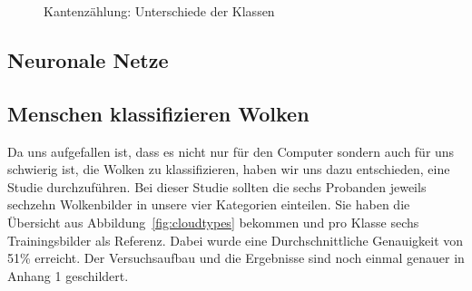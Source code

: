 \documentclass[a4,german]{article}
\begin{document}
\begin{figure}[h!]%
\caption{Kantenzählung: Unterschiede der Klassen}
    \label{fig:kbs}
\end{figure}

\subsection{Neuronale Netze}

\subsection{Menschen klassifizieren Wolken}
Da uns aufgefallen ist, dass es nicht nur für den Computer sondern auch für uns schwierig ist, die Wolken zu klassifizieren, haben wir uns dazu entschieden, eine Studie durchzuführen. Bei dieser Studie sollten die sechs Probanden jeweils sechzehn Wolkenbilder in unsere vier Kategorien einteilen. Sie haben die Übersicht aus Abbildung~\ref{fig:cloudtypes} bekommen und pro Klasse sechs Trainingsbilder als Referenz. Dabei wurde eine Durchschnittliche Genauigkeit von 51\% erreicht. Der Versuchsaufbau und die Ergebnisse sind noch einmal genauer in Anhang 1%
geschildert.
\end{document}
